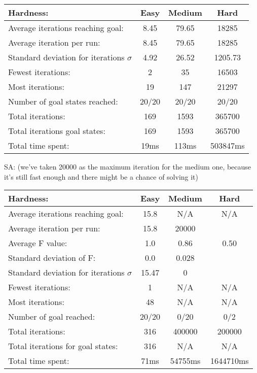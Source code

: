 \documentclass[12pt, a4paper]{article}
\begin{document}
\begin{center}
  \begin{tabular}{| l | c c c|}
    \hline
    Hardness: &\textbf{Easy} & \textbf{Medium} & \textbf{Hard} \\ \hline
    Average iterations reaching goal: & 8.45& 79.65 & 18285\\
    Average iteration per run:  & 8.45 & 79.65 & 18285\\
    Standard deviation for iterations $\sigma$ & 4.92 & 26.52 & 1205.73\\
    Fewest iterations: & 2 & 35& 16503\\ 
    Most iterations: & 19 & 147& 21297\\ 
    Number of goal states reached: & 20/20 & 20/20 & 20/20\\
    Total iterations: & 169 & 1593& 365700\\
    Total iterations goal states: & 169 & 1593& 365700\\
    Total time spent: & 19ms & 113ms & 503847ms\\
    \hline
  \end{tabular}
\end{center}
\noindent
SA: (we've taken 20000 as the maximum iteration for the medium one, because it's still fast enough and there might be a chance of solving it)\\
\begin{center}
  \begin{tabular}{| l | c c c|}
    \hline
    Hardness: &\textbf{Easy} & \textbf{Medium} & \textbf{Hard} \\ \hline
    Average iterations reaching goal: & 15.8& N/A & N/A\\
    Average iteration per run:  & 15.8 & 20000 &  \\
    Average F value: & 1.0 & 0.86 & 0.50\\
    Standard deviation of F: & 0.0 & 0.028 & \\
    Standard deviation for iterations $\sigma$ & 15.47 & 0 & \\
    Fewest iterations: & 1 & N/A & N/A\\ 
    Most iterations: & 48 & N/A& N/A\\ 
    Number of goal reached: & 20/20 & 0/20 & 0/2\\
    Total iterations: & 316 & 400000& 200000\\
    Total iterations for goal states: & 316 & N/A& N/A\\
    Total time spent: & 71ms & 54755ms & 1644710ms\\
    \hline
  \end{tabular}
\end{center}
\end{document}
